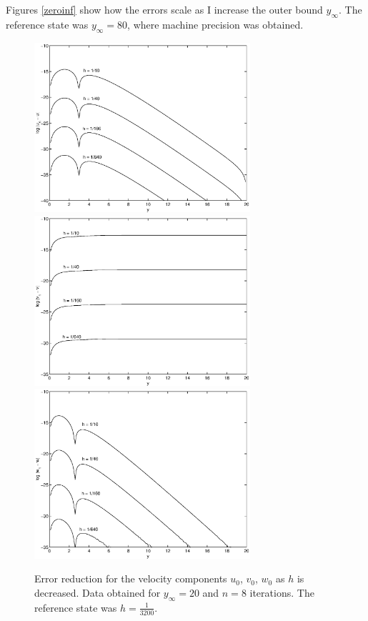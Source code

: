 \documentclass[10pt,a4paper]{report}
\begin{document}
Figures \ref{zeroinf} show how the errors scale as I increase the outer bound $y_\infty$. The reference state was $y_\infty = 80$, where machine precision was obtained.

\begin{figure}[ht]
\centering
\includegraphics[width=8cm]{pics/u0h.eps}
\includegraphics[width=8cm]{pics/v0h.eps}
\includegraphics[width=8cm]{pics/w0h.eps}
\caption[Error reduction for $k=0$ as $h$ is decreased]{Error reduction for the velocity components $u_0$, $v_0$, $w_0$ as $h$ is decreased. Data obtained for $y_\infty = 20$ and $n = 8$ iterations. The reference state was $h = \frac{1}{3200}$.}
\label{zeroh}
\end{figure}
\end{document}
